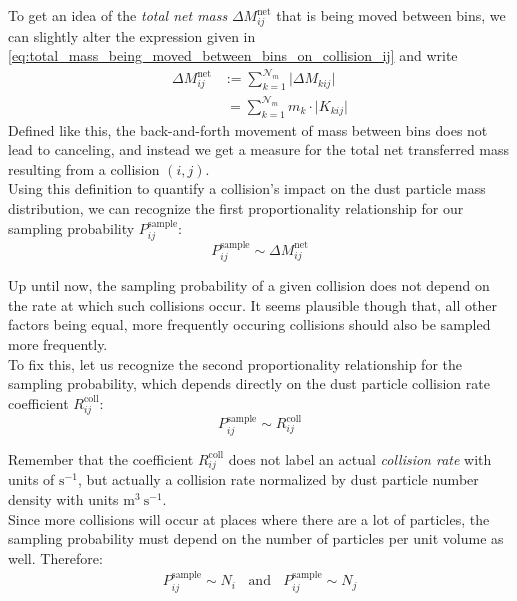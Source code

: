     To get an idea of the \textit{total net mass} $\Delta M^\text{net}_{ij}$ 
    that is being moved between bins, we can slightly alter the expression given in 
    \cref{eq:total_mass_being_moved_between_bins_on_collision_ij} and write 
    \begin{align}
        \Delta M^\text{net}_{ij} 
        &:= \sum_{k=1}^{\mathcal N_m} \big| \Delta M_{kij} \big| \\
        &\ = \sum_{k=1}^{\mathcal N_m} m_k \cdot \big| K_{kij} \big|
    \end{align}
    Defined like this, the back-and-forth movement of mass between bins does not lead to canceling, 
    and instead we get a measure for the total net transferred mass resulting from a collision
    $(i, j)$. \\

    Using this definition to quantify a collision's impact on the dust particle mass distribution,
    we can recognize the first proportionality relationship for our sampling probability
    $P^\text{sample}_{ij}$:
    \begin{equation}
        P_{ij}^\text{sample} \sim \Delta M^\text{net}_{ij}
    \end{equation}

    \clearpage

    Up until now, the sampling probability of a given collision does not depend on the rate at 
    which such collisions occur. 
    It seems plausible though that, all other factors being equal, more frequently occuring 
    collisions should also be sampled more frequently. \\

    To fix this, let us recognize the second proportionality
    relationship for the sampling probability, which depends directly on the dust particle 
    collision rate coefficient $R_{ij}^\text{coll}$:
    \begin{equation}
        P_{ij}^\text{sample} \sim R^\text{coll}_{ij}
    \end{equation}

    Remember that the coefficient $R^\text{coll}_{ij}$ does not label an actual 
    \textit{collision rate} with units of $\text{s}^{-1}$, but actually a collision rate normalized 
    by dust particle number density with units $\text{m}^{3}\ \text{s}^{-1}$. \\

    Since more collisions will occur at places where there are a lot of particles, the 
    sampling probability must depend on the number of particles per unit volume as well. 
    Therefore:
    \begin{align}
        P_{ij}^\text{sample} \sim N_i 
        \ \ \ \ \text{and} \ \ \ \
        P_{ij}^\text{sample} \sim N_j
    \end{align}

